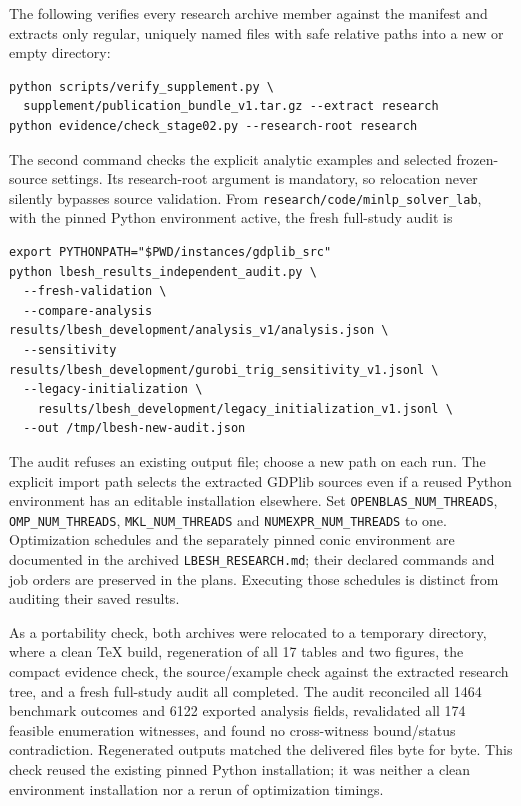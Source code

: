 The following verifies every research archive member against the manifest and extracts only regular, uniquely named files with safe relative paths into a new or empty directory:
\begin{verbatim}
python scripts/verify_supplement.py \
  supplement/publication_bundle_v1.tar.gz --extract research
python evidence/check_stage02.py --research-root research
\end{verbatim}
The second command checks the explicit analytic examples and selected frozen-source settings. Its research-root argument is mandatory, so relocation never silently bypasses source validation. From \texttt{research/code/minlp\_solver\_lab}, with the pinned Python environment active, the fresh full-study audit is
\begin{small}\begin{verbatim}
export PYTHONPATH="$PWD/instances/gdplib_src"
python lbesh_results_independent_audit.py \
  --fresh-validation \
  --compare-analysis results/lbesh_development/analysis_v1/analysis.json \
  --sensitivity results/lbesh_development/gurobi_trig_sensitivity_v1.jsonl \
  --legacy-initialization \
    results/lbesh_development/legacy_initialization_v1.jsonl \
  --out /tmp/lbesh-new-audit.json
\end{verbatim}\end{small}
The audit refuses an existing output file; choose a new path on each run. The explicit import path selects the extracted GDPlib sources even if a reused Python environment has an editable installation elsewhere. Set \texttt{OPENBLAS\_NUM\_THREADS}, \texttt{OMP\_NUM\_THREADS}, \texttt{MKL\_NUM\_THREADS} and \texttt{NUMEXPR\_NUM\_THREADS} to one. Optimization schedules and the separately pinned conic environment are documented in the archived \texttt{LBESH\_RESEARCH.md}; their declared commands and job orders are preserved in the plans. Executing those schedules is distinct from auditing their saved results.

As a portability check, both archives were relocated to a temporary directory, where a clean TeX build, regeneration of all 17 tables and two figures, the compact evidence check, the source/example check against the extracted research tree, and a fresh full-study audit all completed. The audit reconciled all 1464 benchmark outcomes and 6122 exported analysis fields, revalidated all 174 feasible enumeration witnesses, and found no cross-witness bound/status contradiction. Regenerated outputs matched the delivered files byte for byte. This check reused the existing pinned Python installation; it was neither a clean environment installation nor a rerun of optimization timings.
